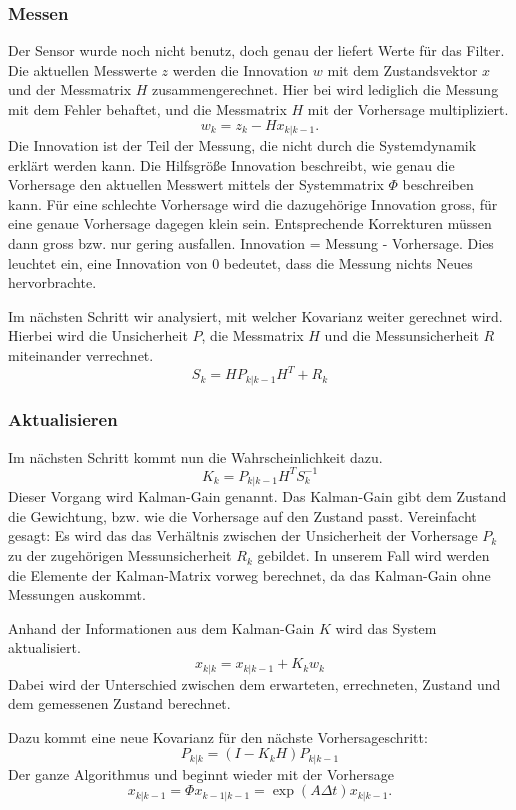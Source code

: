 \subsubsection*{Messen}
Der Sensor wurde noch nicht benutz, doch genau der liefert Werte für das Filter. 
Die aktuellen Messwerte $z$ werden die Innovation $w$ mit dem Zustandsvektor $x$ und der Messmatrix $H$ zusammengerechnet.
Hier bei wird lediglich die Messung mit dem Fehler behaftet, und die Messmatrix $H$ mit der Vorhersage multipliziert.
\[
{w_{k}}={z_{k}}-{H}{x_{k|k-1}}.
\] 
Die Innovation ist der Teil der Messung, die nicht durch die Systemdynamik erklärt werden kann. 
Die Hilfsgröße Innovation beschreibt, wie genau die Vorhersage den aktuellen Messwert mittels der Systemmatrix $\Phi$ beschreiben kann. 
Für eine schlechte Vorhersage wird die dazugehörige Innovation gross, für eine genaue Vorhersage dagegen klein sein. 
Entsprechende Korrekturen müssen dann gross bzw. nur gering ausfallen. 
Innovation = Messung - Vorhersage. Dies leuchtet ein, eine Innovation von 0 bedeutet, dass die Messung nichts Neues hervorbrachte.

Im nächsten Schritt wir analysiert, mit welcher Kovarianz weiter gerechnet wird. 
Hierbei wird die Unsicherheit $P$, die Messmatrix $H$ und die Messunsicherheit $R$ miteinander verrechnet. 
\[ 
{S_{k}}={H}{P_{k|k-1}}{H}^T+{R_{k}}
\] 

\subsubsection*{Aktualisieren}
Im nächsten Schritt kommt nun die Wahrscheinlichkeit dazu. 
\[{K_{k}}= {P_{k|k-1}} {H^T}{S_{k}^{-1}}\] 
Dieser Vorgang wird Kalman-Gain genannt. 
Das Kalman-Gain gibt dem Zustand die Gewichtung, bzw. wie die Vorhersage auf den Zustand passt.
Vereinfacht gesagt: Es wird das das Verhältnis zwischen der Unsicherheit der Vorhersage $P_k$ zu der zugehörigen Messunsicherheit $R_k$ gebildet. 
In unserem Fall wird werden die Elemente der Kalman-Matrix vorweg berechnet, da das Kalman-Gain ohne Messungen auskommt. 

Anhand der Informationen aus dem Kalman-Gain $K$ wird das System aktualisiert.
\[
{x_{k|k}}={x_{k|k-1}}+{K_{k}}{w_{k}}
\] 
Dabei wird der Unterschied zwischen dem erwarteten, errechneten, Zustand und dem gemessenen Zustand berechnet.

Dazu kommt  eine neue Kovarianz für den nächste Vorhersageschritt:
\[
{P_{k|k}}=(I-{K_{k}}{H}){P_{k|k-1}} 
\] 
Der ganze Algorithmus und beginnt wieder mit der Vorhersage 
\[
{x_{k|k-1}}=\Phi{x_{k-1|k-1}}= \exp(A\Delta t){x_{k|k-1}}.
\] 

